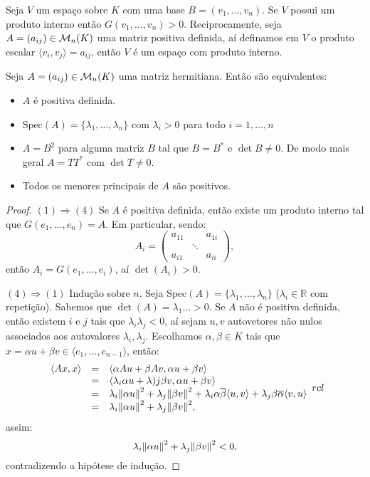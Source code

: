 \documentclass[11pt,twoside,a4paper]{book}
\begin{document}
\begin{proposicao}
Seja $V$ um espaço sobre $K$ com uma base $B=(v_1,\dots,v_n)$. Se $V$ possui um produto interno então $G(v_1,\dots,v_n)>0$. Reciprocamente, seja $A=(a_{ij})\in\mathcal{M}_{n}(K)$ uma matriz positiva definida, aí definamos em $V$ o produto escalar $\langle v_i,v_j\rangle=a_{ij}$, então $V$ é um espaço com produto interno.
\end{proposicao}

\begin{teorema}
Seja $A=(a_{ij})\in\mathcal{M}_{n}(K)$ uma matriz hermitiana. Então são equivalentes:
\begin{itemize}
\item $A$ é positiva definida.
\item $\mathrm{Spec}(A)=\{\lambda_1,\dots,\lambda_n\}$ com $\lambda_i>0$ para todo $i=1,\dots,n$
\item $A=B^2$ para alguma matriz $B$ tal que $B=B^*$ e $\det B\neq 0$. De modo mais geral $A=TT^*$ com $\det T\neq 0$.
\item Todos os menores principais de $A$ são positivos.
\end{itemize}
\end{teorema}
\begin{proof}
$(1)\Rightarrow(4)$ Se $A$ é positiva definida, então existe um produto interno tal que $G(e_1,\dots,e_n)=A$. Em particular, sendo:
\[
A_i=\begin{pmatrix}
a_{11}&&a_{1i}\\&\ddots&\\a_{i1}&&a_{ii}
\end{pmatrix},
\]
então $A_i=G(e_1,\dots,e_i)$, aí $\det(A_i)>0$.

\medskip
\noindent
$(4)\Rightarrow(1)$ Indução sobre $n$. Seja $\mathrm{Spec}(A)=\{\lambda_1,\dots,\lambda_n\}$ ($\lambda_i\in\mathbb{R}$ com repetição). Sabemos que $\det(A)=\lambda_1\dots>0$. Se $A$ não é positiva definida, então existem $i$ e $j$ tais que $\lambda_i\lambda_j<0$, aí sejam $u,v$ autovetores não nulos associados aos autovalores $\lambda_i,\lambda_j$. Escolhamos $\alpha,\beta\in K$ tais que $x=\alpha u+\beta v\in\langle e_1,\dots,e_{n-1}\rangle$, então:
\[
\begin{array}{rcl}
\langle Ax,x\rangle&=&\langle \alpha Au+\beta Av,\alpha u+\beta v\rangle\\
&=&\langle \lambda_i\alpha u+\lambda)j\beta v,\alpha u+\beta v\rangle\\
&=&\lambda_i\norm{\alpha u}^2+\lambda_j\norm{\beta v}^2+\lambda_i\alpha\overline{\beta}\langle u,v\rangle+\lambda_j\beta\overline{\alpha}\langle v,u\rangle\\
&=&\lambda_i\norm{\alpha u}^2+\lambda_j\norm{\beta v}^2,
\end{array}{rcl}
\]
assim:
\[
\lambda_i\norm{\alpha u}^2+\lambda_j\norm{\beta v}^2<0,
\]
contradizendo a hipótese de indução.
\end{proof}
\end{document}

